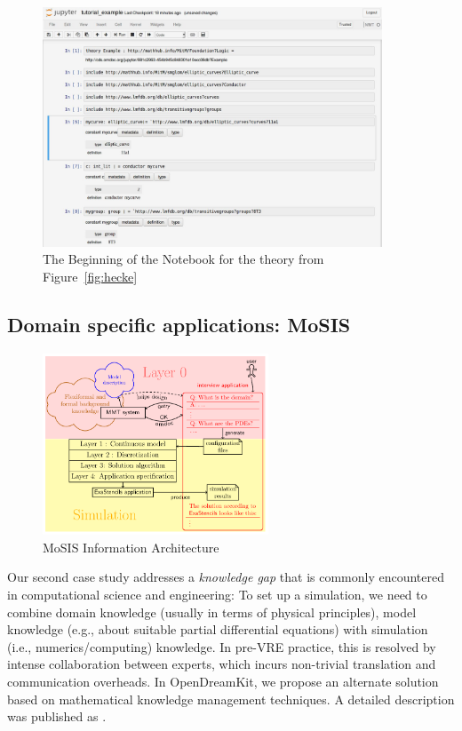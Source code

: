 \begin{figure}[ht]\centering
  \includegraphics[width=0.9\textwidth]{lmfdb_example}
  \caption{The Beginning of the Notebook for the theory from Figure~\ref{fig:hecke}}\label{fig:lmfdbexample}
\end{figure}


\subsection{Domain specific applications: MoSIS}

\begin{figure}[ht]\centering
  \includegraphics[width=0.6\textwidth]{proto}
  \caption{MoSIS Information Architecture}\label{fig:prototype}
\end{figure}

Our second case study addresses a \emph{knowledge gap} that is commonly encountered in computational science and engineering:
To set up a simulation, we need to combine domain knowledge (usually in terms of physical principles), model knowledge (e.g., about suitable partial differential equations) with simulation (i.e., numerics/computing) knowledge.
In pre-VRE practice, this is resolved by intense collaboration between experts, which incurs non-trivial translation and communication overheads.
In OpenDreamKit, we propose an alternate solution based on mathematical knowledge management techniques.
A detailed description was published as \cite{PolKohKoe:kacse18}.

